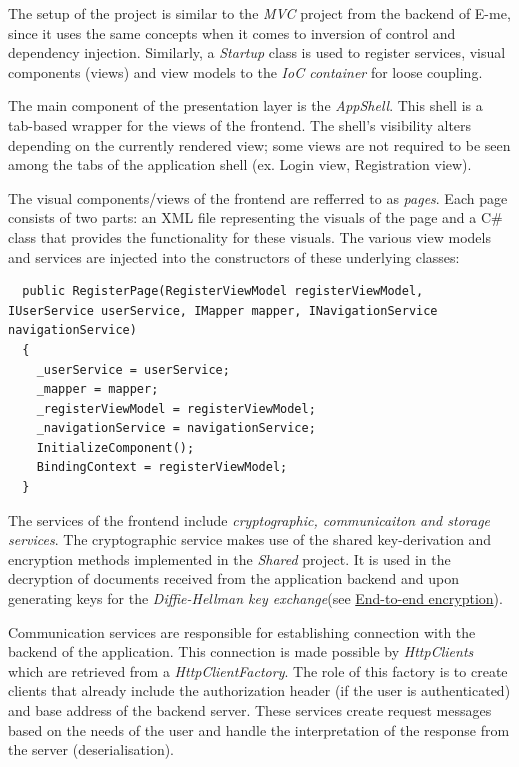 The setup of the project is similar to the \emph{MVC} project from the backend of E-me, since it uses the same concepts when it comes to
inversion of control and dependency injection.
Similarly, a \emph{Startup} class is used to register services, visual components (views) and view models to the \emph{IoC container} for loose coupling.

The main component of the presentation layer is the \emph{AppShell}.
This shell is a tab-based wrapper for the views of the frontend.
The shell's visibility alters depending on the currently rendered view; some views are not required to be seen among the tabs of the application shell (ex. Login view, Registration view).

The visual components/views of the frontend are refferred to as \emph{pages}.
Each page consists of two parts: an XML file representing the visuals of the page and a C\# class that provides the functionality for these visuals.
The various view models and services are injected into the constructors of these underlying classes:

\begin{lstlisting}
  public RegisterPage(RegisterViewModel registerViewModel, IUserService userService, IMapper mapper, INavigationService navigationService)
  {
	_userService = userService;
	_mapper = mapper;
	_registerViewModel = registerViewModel;
	_navigationService = navigationService;
	InitializeComponent();
	BindingContext = registerViewModel;
  }
\end{lstlisting}

The services of the frontend include \emph{cryptographic, communicaiton and storage services}.
The cryptographic service makes use of the shared key-derivation and encryption methods implemented in the \emph{Shared} project.
It is used in the decryption of documents received from the application backend and upon generating keys for the \emph{Diffie-Hellman key exchange}(see \hyperref[end-to-end-encryption]{End-to-end encryption}). 

Communication services are responsible for establishing connection with the backend of the application.
This connection is made possible by \emph{HttpClients} which are retrieved from a \emph{HttpClientFactory}.
The role of this factory is to create clients that already include the authorization header (if the user is authenticated) and base address of the backend server.
These services create request messages based on the needs of the user and handle the interpretation of the response from the server (deserialisation).

